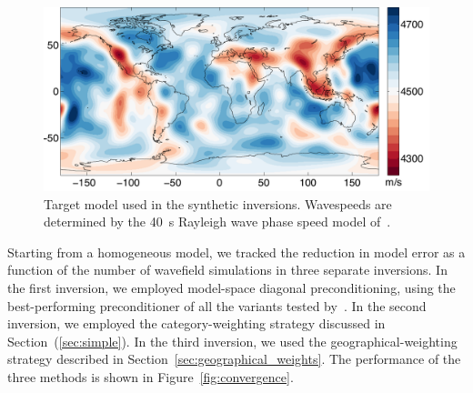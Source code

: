 \begin{figure}
    \centering
    \begin{minipage}[t]{.9\columnwidth}
    \includegraphics[width=.9\textwidth]{ch-weighting/figures/2Dmodel.pdf}  %
    \end{minipage}
  \caption[Target model used in the synthetic inversions for testing weighting strategies]{\small{Target model used in the synthetic inversions. Wavespeeds are determined by the 40~s Rayleigh wave phase speed model of~\cite{Trampert2003}.
}}
\label{fig:test-model}
\end{figure}
 
Starting from a homogeneous model, we tracked the reduction in model error as a function of the number of wavefield simulations in three separate inversions.
In the first inversion, we employed model-space diagonal preconditioning, using the best-performing preconditioner of all the variants tested by~\cite{Modrak2016}.
In the second inversion, we employed the category-weighting 
strategy discussed in Section~(\ref{sec:simple}).  
 In the third inversion, we used the geographical-weighting strategy described in Section~\ref{sec:geographical_weights}. The performance of the three methods is shown in Figure~\ref{fig:convergence}. 

